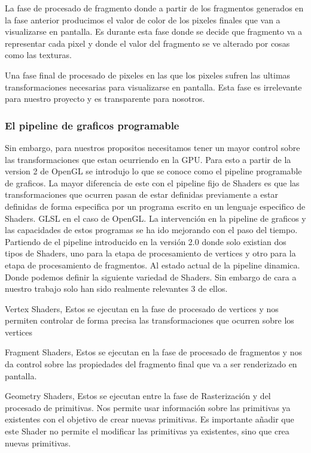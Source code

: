 \begin{list}{.}{}
    \item La fase de procesado de fragmento donde a partir de los fragmentos generados en la fase anterior producimos el valor de color de los pixeles finales que van a visualizarse en pantalla. Es durante esta fase donde se decide que fragmento va a representar cada pixel y donde el valor del fragmento se ve alterado por cosas como las texturas.\cite{freeSI03graphicsPipeline}
    \item Una fase final de procesado de pixeles en las que los pixeles sufren las ultimas transformaciones necesarias para visualizarse en pantalla. Esta fase es irrelevante para nuestro proyecto y es transparente para nosotros.

\end{list}

\subsubsection{El pipeline de graficos programable}

Sin embargo, para nuestros propositos necesitamos tener un mayor control sobre las transformaciones que estan ocurriendo en la GPU. Para esto a partir de la version 2 de OpenGL se introdujo lo que se conoce como el pipeline programable de graficos. La mayor diferencia de este con el pipeline fijo de Shaders es que las transformaciones que ocurren pasan de estar definidas previamente
a estar definidas de forma especifica por un programa escrito en un lenguaje especifico de Shaders. GLSL en el caso de OpenGL. La intervención en la pipeline de graficos y las capacidades de estos programas se ha ido mejorando con el paso del tiempo. Partiendo de el pipeline introducido en la versión 2.0 donde solo existian dos tipos de Shaders, uno para la etapa de procesamiento de vertices y otro para la etapa de procesamiento de fragmentos.
Al estado actual de la pipeline dinamica. Donde podemos definir la siguiente variedad de Shaders. Sin embargo de cara a nuestro trabajo solo han sido realmente relevantes 3 de ellos.

\begin{list}{.}{}
\item Vertex Shaders, Estos se ejecutan en la fase de procesado de vertices y nos permiten controlar de forma precisa las transformaciones que ocurren sobre los vertices
\item Fragment Shaders, Estos se ejecutan en la fase de procesado de fragmentos y nos da control sobre las propiedades del fragmento final que va a ser renderizado en pantalla.
\item Geometry Shaders, Estos se ejecutan entre la fase de Rasterización y del procesado de primitivas. Nos permite usar información sobre las primitivas ya existentes con el objetivo de crear nuevas primitivas. Es importante añadir que este Shader no permite
el modificar las primitivas ya existentes, sino que crea nuevas primitivas.
\end{list} \cite{khronosShaderOpenGL}

